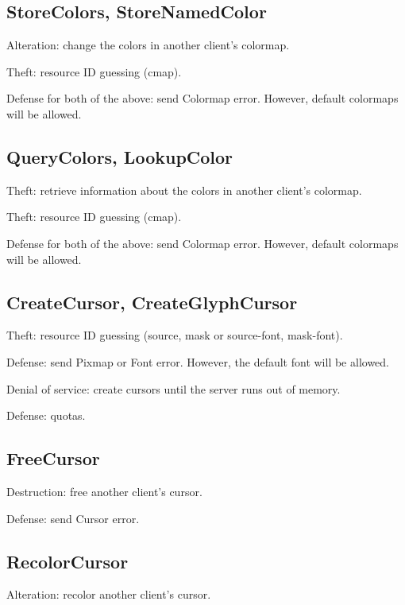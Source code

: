 \subsection{StoreColors, StoreNamedColor}

Alteration: change the colors in another client's colormap.

Theft: resource ID guessing (cmap).

Defense for both of the above: send Colormap error.  However, default
colormaps will be allowed.



\subsection{QueryColors, LookupColor}

Theft: retrieve information about the colors in another client's
colormap.

Theft: resource ID guessing (cmap).

Defense for both of the above: send Colormap error.  However, default
colormaps will be allowed.



\subsection{CreateCursor, CreateGlyphCursor}

Theft: resource ID guessing (source, mask or source-font, mask-font).

Defense: send Pixmap or Font error.  However, the default font will be
allowed.

Denial of service: create cursors until the server runs out of memory.

Defense: quotas.



\subsection{FreeCursor}

Destruction: free another client's cursor.

Defense: send Cursor error.



\subsection{RecolorCursor}

Alteration: recolor another client's cursor.

